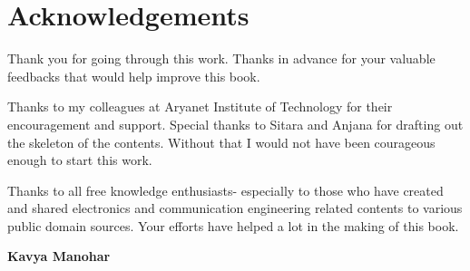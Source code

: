 \chapter*{Acknowledgements}

Thank you for going through this work. Thanks in advance for your valuable feedbacks that would help improve this book.


Thanks to my colleagues at Aryanet Institute of Technology for their encouragement and support. Special thanks to Sitara and Anjana for drafting out the skeleton of the contents. Without that I would not have been courageous enough to start this work.

Thanks to all free knowledge enthusiasts- especially to those who have created and shared electronics and communication engineering related contents to various public domain sources. Your efforts have helped a lot in the making of this book.

\begin{flushright}
\textbf{Kavya Manohar}
\end{flushright}

